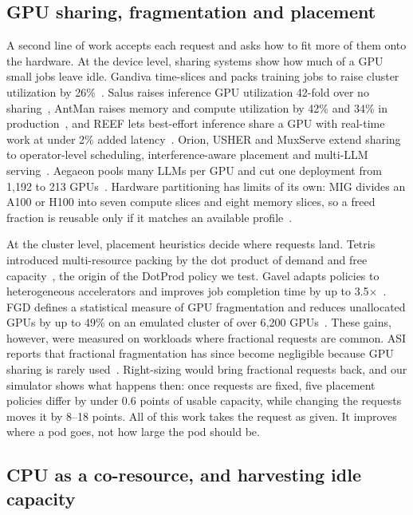 \documentclass[10pt]{article}
\begin{document}
\subsection{GPU sharing, fragmentation and placement}
\label{sec:rw-share}

A second line of work accepts each request and asks how to fit more of them onto the hardware. At the device level, sharing systems show how much of a GPU small jobs leave idle. Gandiva time-slices and packs training jobs to raise cluster utilization by 26\%~\citep{xiao2018gandiva}. Salus raises inference GPU utilization 42-fold over no sharing~\citep{yu2020salus}, AntMan raises memory and compute utilization by 42\% and 34\% in production~\citep{xiao2020antman}, and REEF lets best-effort inference share a GPU with real-time work at under 2\% added latency~\citep{han2022reef}. Orion, USHER and MuxServe extend sharing to operator-level scheduling, interference-aware placement and multi-LLM serving~\citep{strati2024orion,shubha2024usher,duan2024muxserve}. Aegaeon pools many LLMs per GPU and cut one deployment from 1{,}192 to 213 GPUs~\citep{xiang2025aegaeon}. Hardware partitioning has limits of its own: MIG divides an A100 or H100 into seven compute slices and eight memory slices, so a freed fraction is reusable only if it matches an available profile~\citep{nvidia2026mig}.

At the cluster level, placement heuristics decide where requests land. Tetris introduced multi-resource packing by the dot product of demand and free capacity~\citep{grandl2014tetris}, the origin of the DotProd policy we test. Gavel adapts policies to heterogeneous accelerators and improves job completion time by up to 3.5$\times$~\citep{narayanan2020gavel}. FGD defines a statistical measure of GPU fragmentation and reduces unallocated GPUs by up to 49\% on an emulated cluster of over 6{,}200 GPUs~\citep{weng2023fgd}. These gains, however, were measured on workloads where fractional requests are common. ASI reports that fractional fragmentation has since become negligible because GPU sharing is rarely used~\citep{li2026asi}. Right-sizing would bring fractional requests back, and our simulator shows what happens then: once requests are fixed, five placement policies differ by under 0.6 points of usable capacity, while changing the requests moves it by 8--18 points. All of this work takes the request as given. It improves where a pod goes, not how large the pod should be.

\subsection{CPU as a co-resource, and harvesting idle capacity}
\label{sec:rw-cpu}
\end{document}
